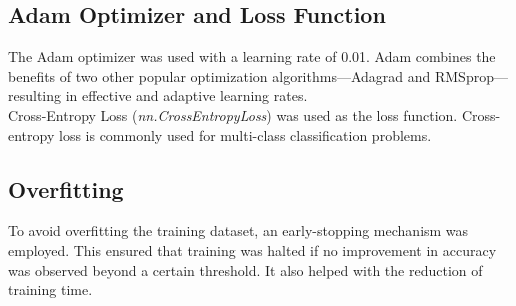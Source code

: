 \subsection*{Adam Optimizer and Loss Function}
The Adam optimizer \cite{AdamOptim} was used with a learning rate of 0.01. Adam combines the benefits of two other popular optimization algorithms—Adagrad and RMSprop—resulting in effective and adaptive learning rates. \\

\noindent Cross-Entropy Loss (\textit{nn.CrossEntropyLoss}) \cite{LossFunction} was used as the loss function. Cross-entropy loss is commonly used for multi-class classification problems.

\subsection*{Overfitting}

\noindent To avoid overfitting the training dataset, an early-stopping mechanism was employed. This ensured that training was halted if no improvement in accuracy was observed beyond a certain threshold. It also helped with the reduction of training time. 

